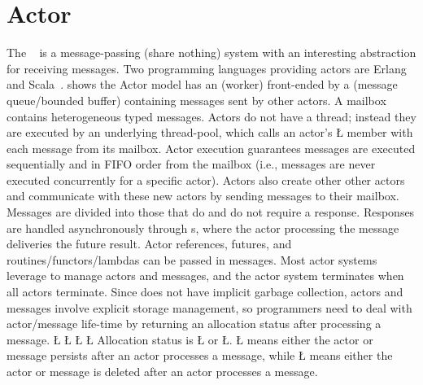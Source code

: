 \documentclass[openright,twoside]{report}
\begin{document}
\section{Actor}
\label{s:Actor}

The ~\cite{Hewitt73,Actors} is a message-passing (share nothing) system with an interesting abstraction for receiving messages.
Two programming languages providing actors are Erlang~\cite{Erlang} and Scala~\cite{Scala}.
 shows the Actor model has an  (worker) front-ended by a  (message queue/bounded buffer) containing messages sent by other actors.
A mailbox contains heterogeneous typed messages.
Actors do not have a thread;
instead they are executed by an underlying thread-pool, which calls an actor's \LGinlinetrue\LGbegin\lgrinde\L{}\endlgrinde\LGend{} member with each message from its mailbox.
Actor execution guarantees messages are executed sequentially and in FIFO order from the mailbox (i.e., messages are never executed concurrently for a specific actor).
Actors also create other other actors and communicate with these new actors by sending messages to their mailbox.
Messages are divided into those that do and do not require a response.
Responses are handled asynchronously through s, where the actor processing the message deliveries the future result.
Actor references, futures, and routines/functors/lambdas can be passed in messages.
Most actor systems leverage  to manage actors and messages, and the actor system terminates when all actors terminate.
Since \CC does not have implicit garbage collection, \uC actors and messages involve explicit storage management, so programmers need to deal with actor/message life-time by returning an allocation status after processing a message.
\LGinlinefalse\LGbegin\lgrinde
\L{}
\L{\LB{}}
\CE{}\L{\LB{}}
\L{\LB{\};}}
\endlgrinde\LGend
{}%
%
Allocation status is \LGinlinetrue\LGbegin\lgrinde\L{}\endlgrinde\LGend{} or \LGinlinetrue\LGbegin\lgrinde\L{}\endlgrinde\LGend{}.
\LGinlinetrue\LGbegin\lgrinde\L{}\endlgrinde\LGend{} means either the actor or message persists after an actor processes a message, while \LGinlinetrue\LGbegin\lgrinde\L{}\endlgrinde\LGend{} means either the actor or message is deleted after an actor processes a message.
\end{document}
